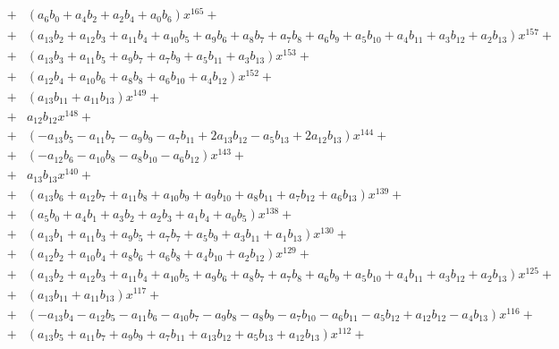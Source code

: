 \documentclass{article}
\begin{document}
\begin{eqnarray*}
&+&   \left(a_{6} b_{0} + a_{4} b_{2} + a_{2} b_{4} + a_{0} b_{6}\right) x^{165}  + \\
&+&   \left(a_{13} b_{2} + a_{12} b_{3} + a_{11} b_{4} + a_{10} b_{5} + a_{9} b_{6} + a_{8} b_{7} + a_{7} b_{8} + a_{6} b_{9} + a_{5} b_{10} + a_{4} b_{11} + a_{3} b_{12} + a_{2} b_{13}\right) x^{157}  + \\
&+&   \left(a_{13} b_{3} + a_{11} b_{5} + a_{9} b_{7} + a_{7} b_{9} + a_{5} b_{11} + a_{3} b_{13}\right) x^{153}  + \\
&+&   \left(a_{12} b_{4} + a_{10} b_{6} + a_{8} b_{8} + a_{6} b_{10} + a_{4} b_{12}\right) x^{152}  + \\
&+&   \left(a_{13} b_{11} + a_{11} b_{13}\right) x^{149}  + \\
&+&   a_{12} b_{12} x^{148}  + \\
&+&   \left(- a_{13} b_{5} -  a_{11} b_{7} -  a_{9} b_{9} -  a_{7} b_{11} + 2 a_{13} b_{12} -  a_{5} b_{13} + 2 a_{12} b_{13}\right) x^{144}  + \\
&+&   \left(- a_{12} b_{6} -  a_{10} b_{8} -  a_{8} b_{10} -  a_{6} b_{12}\right) x^{143}  + \\
&+&   a_{13} b_{13} x^{140}  + \\
&+&   \left(a_{13} b_{6} + a_{12} b_{7} + a_{11} b_{8} + a_{10} b_{9} + a_{9} b_{10} + a_{8} b_{11} + a_{7} b_{12} + a_{6} b_{13}\right) x^{139}  + \\
&+&   \left(a_{5} b_{0} + a_{4} b_{1} + a_{3} b_{2} + a_{2} b_{3} + a_{1} b_{4} + a_{0} b_{5}\right) x^{138}  + \\
&+&   \left(a_{13} b_{1} + a_{11} b_{3} + a_{9} b_{5} + a_{7} b_{7} + a_{5} b_{9} + a_{3} b_{11} + a_{1} b_{13}\right) x^{130}  + \\
&+&   \left(a_{12} b_{2} + a_{10} b_{4} + a_{8} b_{6} + a_{6} b_{8} + a_{4} b_{10} + a_{2} b_{12}\right) x^{129}  + \\
&+&   \left(a_{13} b_{2} + a_{12} b_{3} + a_{11} b_{4} + a_{10} b_{5} + a_{9} b_{6} + a_{8} b_{7} + a_{7} b_{8} + a_{6} b_{9} + a_{5} b_{10} + a_{4} b_{11} + a_{3} b_{12} + a_{2} b_{13}\right) x^{125}  + \\
&+&   \left(a_{13} b_{11} + a_{11} b_{13}\right) x^{117}  + \\
&+&   \left(- a_{13} b_{4} -  a_{12} b_{5} -  a_{11} b_{6} -  a_{10} b_{7} -  a_{9} b_{8} -  a_{8} b_{9} -  a_{7} b_{10} -  a_{6} b_{11} -  a_{5} b_{12} + a_{12} b_{12} -  a_{4} b_{13}\right) x^{116}  + \\
&+&   \left(a_{13} b_{5} + a_{11} b_{7} + a_{9} b_{9} + a_{7} b_{11} + a_{13} b_{12} + a_{5} b_{13} + a_{12} b_{13}\right) x^{112}  + \\

\end{eqnarray*}
\end{document}
